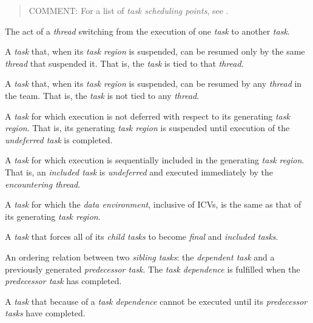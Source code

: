 \begin{quote}
COMMENT: For a list of \emph{task scheduling points}, see .
\end{quote}
\glossarydefend

\glossarydefstart
The act of a \emph{thread} switching from the execution of one \emph{task} to another \emph{task}.
\glossarydefend

\glossarydefstart
A \emph{task} that, when its \emph{task region} is suspended, can be resumed only by the same 
\emph{thread} that suspended it. That is, the \emph{task} is tied to that \emph{thread}. 
\glossarydefend

\glossarydefstart
A \emph{task} that, when its \emph{task region} is suspended, can be resumed by any \emph{thread} in 
the team. That is, the \emph{task} is not tied to any \emph{thread}. 
\glossarydefend

\glossarydefstart
A \emph{task} for which execution is not deferred with respect to its generating \emph{task} 
\emph{region}. That is, its generating \emph{task region} is suspended until execution of the 
\emph{undeferred task} is completed.
\glossarydefend

\glossarydefstart
A \emph{task} for which execution is sequentially included in the generating \emph{task region}. 
That is, an \emph{included task} is \emph{undeferred} and executed immediately by the 
\emph{encountering thread}.
\glossarydefend

\glossarydefstart
A \emph{task} for which the \emph{data environment}, inclusive of ICVs, is the same as that of its 
generating \emph{task region}.
\glossarydefend

\glossarydefstart
A \emph{task} that forces all of its \emph{child tasks} to become \emph{final} and \emph{included tasks}.
\glossarydefend

\glossarydefstart
An ordering relation between two \emph{sibling tasks}: the \emph{dependent task} and a 
previously generated \emph{predecessor task}. The \emph{task dependence} is fulfilled when the 
\emph{predecessor task} has completed.
\glossarydefend

\begin{samepage}
\glossarydefstart
A \emph{task} that because of a \emph{task dependence} cannot be executed until its \emph{predecessor 
tasks} have completed.
\glossarydefend
\end{samepage}

